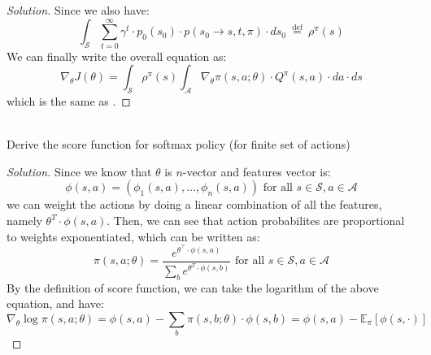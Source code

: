 \documentclass[12pt]{article}
\newenvironment{problem}[2][Problem]{\begin{trivlist}
\item[\hskip \labelsep {\bfseries #1}\hskip \labelsep {\bfseries #2.}]}{\end{trivlist}}
\newenvironment{solution}
  {\renewcommand\qedsymbol{$\blacksquare$}\begin{proof}[Solution]}
  {\end{proof}}
\begin{document}
\begin{solution}
Since we also have:
\begin{equation}
	\int_{\mathcal{S}} \sum_{t=0}^{\infty} \gamma^{t} \cdot p_{0}\left(s_{0}\right) \cdot p\left(s_{0} \rightarrow s, t, \pi\right) \cdot d s_{0} \stackrel{\text { def }}{=} \rho^{\pi}(s)
\end{equation}
We can finally write the overall equation as:
\begin{equation}
	\nabla_{\theta} J(\theta)=\int_{\mathcal{S}} \rho^{\pi}(s) \int_{\mathcal{A}} \nabla_{\theta} \pi(s, a ; \theta) \cdot Q^{\pi}(s, a) \cdot d a \cdot d s
\end{equation}
which is the same as .
\end{solution}

\begin{problem}{2}
	\text{ }\\
	Derive the score function for softmax policy (for finite set of actions)
\end{problem}
\begin{solution}
	Since we know that $\theta$ is $n$-vector and features vector is:
	\begin{equation}
	\phi(s, a)=\left(\phi_{1}(s, a), \ldots, \phi_{n}(s, a)\right) \text { for all } s \in \mathcal{S}, a \in \mathcal{A}
	\end{equation}
	we can weight the actions by doing a linear combination of all the features, namely $\theta^T \cdot \phi(s, a)$.
	Then, we can see that action probabilites are proportional to weights exponentiated, which can be written as:
	\begin{equation}
		\pi(s, a ; \theta)=\frac{e^{\theta^{\top} \cdot \phi(s, a)}}{\sum_{b} e^{\theta^{T} \cdot \phi(s, b)}} \text { for all } s \in \mathcal{S}, a \in \mathcal{A}
	\end{equation}
	By the definition of score function, we can take the logarithm of the above equation, and have:
	\begin{equation}
		\nabla_{\theta} \log \pi(s, a ; \theta)=\phi(s, a)-\sum_{b} \pi(s, b ; \theta) \cdot \phi(s, b)=\phi(s, a)-\mathbb{E}_{\pi}[\phi(s, \cdot)]
	\end{equation}
\end{solution}
\end{document}
